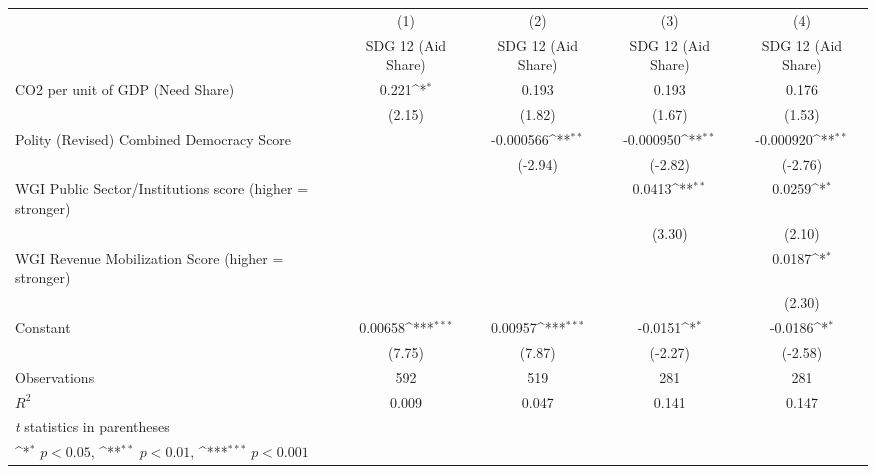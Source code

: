 {
\def\sym#1{\ifmmode^{#1}\else\(^{#1}\)\fi}
\begin{tabular}{l*{4}{c}}
\hline\hline
                &\multicolumn{1}{c}{(1)}&\multicolumn{1}{c}{(2)}&\multicolumn{1}{c}{(3)}&\multicolumn{1}{c}{(4)}\\
                &\multicolumn{1}{c}{SDG 12 (Aid Share)}&\multicolumn{1}{c}{SDG 12 (Aid Share)}&\multicolumn{1}{c}{SDG 12 (Aid Share)}&\multicolumn{1}{c}{SDG 12 (Aid Share)}\\
\hline
CO2 per unit of GDP (Need Share)&    0.221\sym{*}  &    0.193         &    0.193         &    0.176         \\
                &   (2.15)         &   (1.82)         &   (1.67)         &   (1.53)         \\
[1em]
Polity (Revised) Combined Democracy Score&                  &-0.000566\sym{**} &-0.000950\sym{**} &-0.000920\sym{**} \\
                &                  &  (-2.94)         &  (-2.82)         &  (-2.76)         \\
[1em]
WGI Public Sector/Institutions score (higher = stronger)&                  &                  &   0.0413\sym{**} &   0.0259\sym{*}  \\
                &                  &                  &   (3.30)         &   (2.10)         \\
[1em]
WGI Revenue Mobilization Score (higher = stronger)&                  &                  &                  &   0.0187\sym{*}  \\
                &                  &                  &                  &   (2.30)         \\
[1em]
Constant        &  0.00658\sym{***}&  0.00957\sym{***}&  -0.0151\sym{*}  &  -0.0186\sym{*}  \\
                &   (7.75)         &   (7.87)         &  (-2.27)         &  (-2.58)         \\
\hline
Observations    &      592         &      519         &      281         &      281         \\
\(R^{2}\)       &    0.009         &    0.047         &    0.141         &    0.147         \\
\hline\hline
\multicolumn{5}{l}{\footnotesize \textit{t} statistics in parentheses}\\
\multicolumn{5}{l}{\footnotesize \sym{*} \(p<0.05\), \sym{**} \(p<0.01\), \sym{***} \(p<0.001\)}\\
\end{tabular}
}
